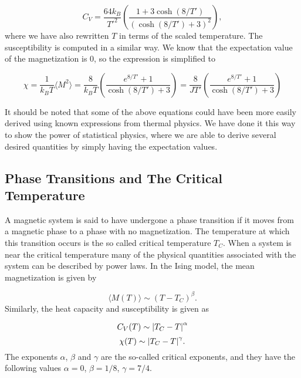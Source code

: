 \documentclass[a4paper, 10pt, reqno]{amsart}
\begin{document}
\begin{equation}\label{eq: 2x2 C_V}
  C_V  = \frac{64k_B}{T'^2}\left( \frac{1 + 3\cosh(8/T')}{(\cosh(8/T') + 3)^2} \right),
\end{equation}
where we have also rewritten $T$ in terms of the scaled temperature.
The susceptibility is computed in a similar way. We know that the expectation value of the magnetization is 0, so the expression is simplified to

\begin{equation}\label{eq: 2x2 chi}
    \chi = \frac { 1 } { k _ { B } T }\langle M^2 \rangle = \frac{8}{k_B T} \left(\frac{e^{8/T'} + 1}{\cosh(8/T') +3}\right) = \frac { 8 }{JT'} \left( \frac{e^{8/T'}+1}{\cosh(8/T') + 3} \right)
\end{equation}

It should be noted that some of the above equations could have been more easily derived using known expressions from thermal physics. We have done it this way to show the power of statistical physics, where we are able to derive several desired quantities by simply having the expectation values.

\subsection{Phase Transitions and The Critical Temperature}
A magnetic system is said to have undergone a phase transition if it moves from a magnetic phase to a phase with no magnetization. The temperature at which this transition occurs is the so called critical temperature $T_C$. When a system is near the critical temperature many of the physical quantities associated with the system can be described by power laws. In the Ising model, the mean magnetization is given by 

\begin{equation} \label{eq: T_C <M>}
    \langle M (T) \rangle \sim (T - T_C)^\beta.
\end{equation}
Similarly, the heat capacity and susceptibility is given as

\begin{equation} \label{eq: T_C <C_V>}
    C_V(T) \sim \abs{T_C - T}^\alpha
\end{equation}
\begin{equation} \label{eq: T_C <chi>}
    \chi(T) \sim \abs{T_C - T}^\gamma.
\end{equation}
The exponents $\alpha$, $\beta$ and $\gamma$ are the so-called critical exponents, and they have the following values $\alpha = 0$, $\beta = 1/8$, $\gamma = 7/4$.
\end{document}
